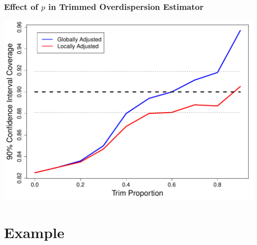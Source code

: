 \documentclass[mathserif,compress]{beamer}\usepackage{graphicx, color}
\makeatletter
\def\maxwidth{ %
  \ifdim\Gin@nat@width>\linewidth
    \linewidth
  \else
    \Gin@nat@width
  \fi
}
\makeatother
\begin{document}
\begin{frame}[fragile]
\frametitle{Effect of $p$ in Trimmed Overdispersion Estimator}

\begin{center}
\includegraphics[width = .85\maxwidth]{figure/CI90TrimProp-plot}
\end{center}

\end{frame}


\section{Example}
\end{document}
